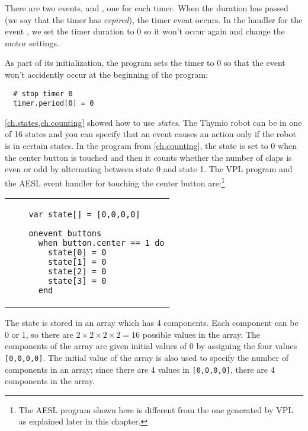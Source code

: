 There are two events,  and , one for each timer.
When the duration has passed (we say that the timer has \emph{expired}),
the timer event occurs. In the handler for the event , we set
the timer duration to 0 so it won't occur again and change the motor
settings.

As part of its initialization, the program sets the timer to 0 so that
the event won't accidently occur at the beginning of the program:

\begin{footnotesize}
\begin{verbatim}
  # stop timer 0
  timer.period[0] = 0
\end{verbatim}
\end{footnotesize}

\newpage


\cref{ch.states,ch.counting} showed how to use \emph{states}. The
Thymio robot can be in one of 16 states and you can specify that an
event causes an action only if the robot is in certain states. In the
program  from \cref{ch.counting}, the state is set to 0 when
the center button is touched and then it counts whether the number of
claps is even or odd by alternating between state 0 and state 1. The VPL
program and the AESL event handler for touching the center button
are:\footnote{The AESL program shown here is different from the one
generated by VPL as explained later in this chapter.}

\begin{center}
\begin{tabular}{ll}
\raisebox{8ex}{\texttt{[image: two-button]}} &
\begin{minipage}[b]{.5\textwidth}
\begin{footnotesize}
\begin{verbatim}
  var state[] = [0,0,0,0]
  
  onevent buttons
    when button.center == 1 do
      state[0] = 0
      state[1] = 0
      state[2] = 0
      state[3] = 0
    end
\end{verbatim}
\end{footnotesize}
\end{minipage}
\end{tabular}
\end{center}

The state is stored in an array  which has 4 components. Each
component can be 0 or 1, so there are $2\times 2\times 2\times 2=16$
possible values in the array. The components of the array are given
initial values of 0 by assigning the four values
{\footnotesize\verb+[0,0,0,0]+}. The initial value of the array is also
used to specify the number of components in an array; since there are 4
values in {\footnotesize\verb+[0,0,0,0]+}, there are 4 components in the
array.

